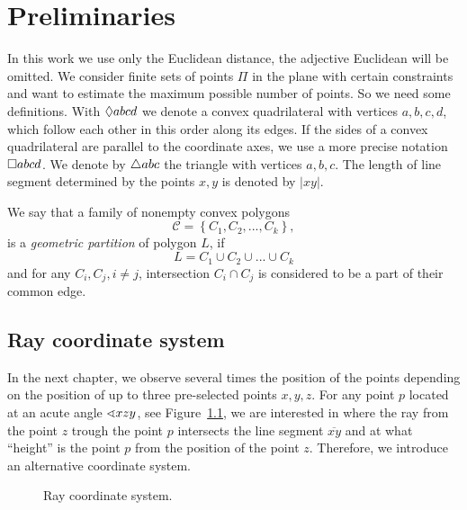 \chapter{Preliminaries}
In this work we use only the Euclidean distance, the adjective Euclidean will be omitted. We consider finite sets of points $\Pi$ in the plane with certain constraints and want to estimate the maximum possible number of points. So we need some definitions. With $\Diamond{abcd}$ we denote a convex quadrilateral with vertices $a,b,c,d$, which follow each other in this order along its edges. If the sides of a convex quadrilateral are parallel to the coordinate axes, we use a more precise notation $\Box{abcd}$. We denote by $\triangle{abc}$ the triangle with vertices $a,b,c$. The length of line segment determined by the points $x,y$ is denoted by $|xy|$.

\begin{definition}
We say that a family of nonempty convex polygons
$$
  \mathcal{C} = \left\{ C_{1}, C_{2}, ..., C_{k} \right\},
$$
is a \textit{geometric partition} of polygon $L$, if
$$
  L = C_{1} \cup C_{2} \cup ... \cup C_{k}
$$
and for any $C_{i}, C_{j}, i \neq j$, intersection $C_{i} \cap C_{j}$ is considered to be a part of their common edge.
\end{definition}

\section{Ray coordinate system}
In the next chapter, we observe several times the position of the points depending on the position of up to three pre-selected points $x, y, z$. For any point $p$ located at an acute angle $\sphericalangle{xzy}$, see Figure~\ref{fig: rays-coordinate-system}, we are interested in where the ray from the point $z$ trough the point $p$ intersects the line segment $\overline{xy}$ and at what ``height'' is the point $p$ from the position of the point $z$. Therefore, we introduce an alternative coordinate system.

\begin{figure}
\begin{center}

\end{center}
\caption{Ray coordinate system.}
\label{fig: rays-coordinate-system}
\end{figure}

